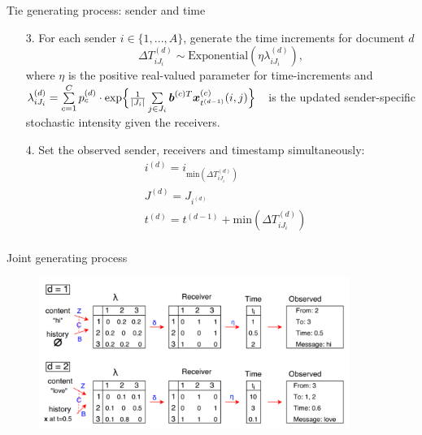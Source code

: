 \documentclass[10pt, xcolor=table]{beamer}
\theoremstyle{definition}
\theoremstyle{remark}
\begin{document}
\begin{frame}{Tie generating process: sender and time}
\begin{itemize}
		\item [3.] For each sender $i \in \{1,...,A\}$, generate the time increments for document $d$
		\begin{equation*}
		\Delta T^{(d)}_{i{J_i}} \sim \mbox{Exponential}(\eta\lambda_{i{J_i}}^{(d)}),
		\end{equation*}\normalsize
		where $\eta$ is the positive real-valued parameter for time-increments and \footnotesize$\lambda^{(d)}_{iJ_i}= \sum\limits_{c=1}^{C} p^{(d)}_c\cdot\mbox{exp}\Big\{\textcolor{black}{\frac{1}{|J_i|}\sum\limits_{j \in J_i} \boldsymbol{b}^{(c)T}\boldsymbol{x}^{(c)}_{t^{(d-1)}}(i, j)}\Big\}\quad$\normalsize is the updated sender-specific stochastic intensity given the receivers.\vspace{0.4cm}
		\item[4.] Set the observed sender, receivers and timestamp simultaneously:
			\begin{equation*}
		\begin{aligned}
		&i^{(d)} = i_{\mbox{min}(\Delta T^{(d)}_{i{J_i}})} \\
		&J^{(d)} = J_{i^{(d)}}\\
		&t^{(d)} = t^{(d-1)}+\mbox{min}(\Delta T^{(d)}_{i{J_i}})\\
		\end{aligned}
		\end{equation*}
		\normalsize
\end{itemize}
\end{frame}

\begin{frame}{Joint generating process}

	\begin{figure}
		\includegraphics[width=0.9\textwidth]{figures/summary.pdf}
	\end{figure}	\vspace{0.1cm}

\end{frame}
\end{document}
